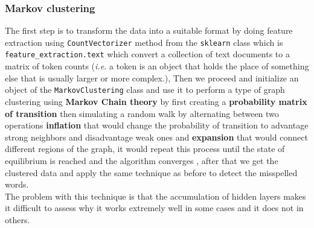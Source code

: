 \documentclass{article}
\begin{document}
\subsubsection{Markov clustering}
The first step is to transform the data into a suitable format by doing feature extraction using \texttt{CountVectorizer} method from the \texttt{sklearn} class which is \texttt{feature\_extraction.text} \cite{vector} which convert a collection of text documents to a matrix of token counts (\textit{i.e.} a token is an object that holds the place of something else that is usually larger or more complex.), Then we proceed and initialize an object of the \texttt{MarkovClustering} class \cite{MarkovClustering} and use it to perform a type of graph clustering using \textbf{Markov Chain theory} by first creating a \textbf{probability matrix of transition} then simulating a random walk by alternating between two operations \textbf{inflation} that would change the probability of transition to advantage strong neighbors and disadvantage weak ones and \textbf{expansion} that would connect different regions of the graph, it would repeat this process until the state of equilibrium is reached and the algorithm converges \cite{explainMCL}, after that we get the clustered data and apply the same technique as before to detect the misspelled words.\\
The problem with this technique is that the accumulation of hidden layers makes it difficult to assess why it works extremely well in some cases and it does not in others.
\end{document}
